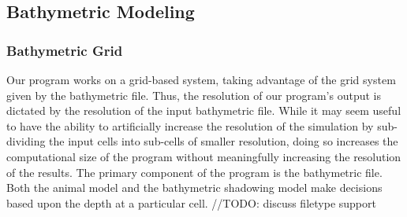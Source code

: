 \subsection{Bathymetric Modeling}
\label{bathymetyricModeling}
\subsubsection{Bathymetric Grid}
\label{bathymetricGrid}
Our program works on a grid-based system, taking advantage of the grid system given by the bathymetric file.  Thus, the resolution of our program's output is dictated by the resolution of the input bathymetric file.  While it may seem useful to have the ability to artificially increase the resolution of the simulation by sub-dividing the input cells into sub-cells of smaller resolution, doing so increases the computational size of the program without meaningfully increasing the resolution of the results.  The primary component of the program is the bathymetric file.  Both the animal model and the bathymetric shadowing model make decisions based upon the depth at a particular cell.  
//TODO: discuss filetype support


